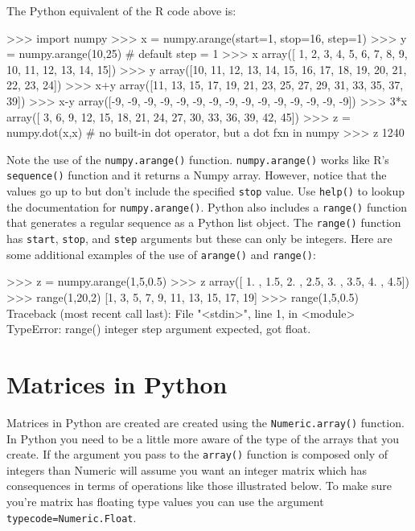 The Python equivalent of the R code above is:
%
\begin{python}
>>> import numpy
>>> x = numpy.arange(start=1, stop=16, step=1)
>>> y = numpy.arange(10,25) # default step = 1
>>> x
array([ 1,  2,  3,  4,  5,  6,  7,  8,  9, 10, 11, 12, 13, 14, 15])
>>> y
array([10, 11, 12, 13, 14, 15, 16, 17, 18, 19, 20, 21, 22, 23, 24])
>>> x+y
array([11, 13, 15, 17, 19, 21, 23, 25, 27, 29, 31, 33, 35, 37, 39])
>>> x-y
array([-9, -9, -9, -9, -9, -9, -9, -9, -9, -9, -9, -9, -9, -9, -9])
>>> 3*x
array([ 3,  6,  9, 12, 15, 18, 21, 24, 27, 30, 33, 36, 39, 42, 45])
>>> z = numpy.dot(x,x) # no built-in dot operator, but a dot fxn in numpy
>>> z
1240
\end{python}
%
Note the use of the \lstinline!numpy.arange()! function.
\lstinline!numpy.arange()! works like R's \lstinline!sequence()!
function and it returns a Numpy array. However, notice that the values
go up to but don't include the specified \lstinline!stop! value. Use
\lstinline!help()! to lookup the documentation for
\lstinline!numpy.arange()!. Python also includes a \lstinline!range()!
function that generates a regular sequence as a Python list object. The
\lstinline!range()! function has \lstinline!start!, \lstinline!stop!,
and \lstinline!step! arguments but these can only be integers. Here are
some additional examples of the use of \lstinline!arange()! and
\lstinline!range()!:

\begin{python}
>>> z = numpy.arange(1,5,0.5) 
>>> z
array([ 1. ,  1.5,  2. ,  2.5,  3. ,  3.5,  4. ,  4.5])
>>> range(1,20,2)
[1, 3, 5, 7, 9, 11, 13, 15, 17, 19]
>>> range(1,5,0.5)
Traceback (most recent call last):
  File "<stdin>", line 1, in <module>
TypeError: range() integer step argument expected, got float.
\end{python}



\section{Matrices in Python}

Matrices in Python are created are created using the
\lstinline!Numeric.array()! function. In Python you need to be a little
more aware of the type of the arrays that you create. If the argument
you pass to the \lstinline!array()! function is composed only of
integers than Numeric will assume you want an integer matrix which has
consequences in terms of operations like those illustrated below. To
make sure you're matrix has floating type values you can use the
argument \lstinline!typecode=Numeric.Float!.

